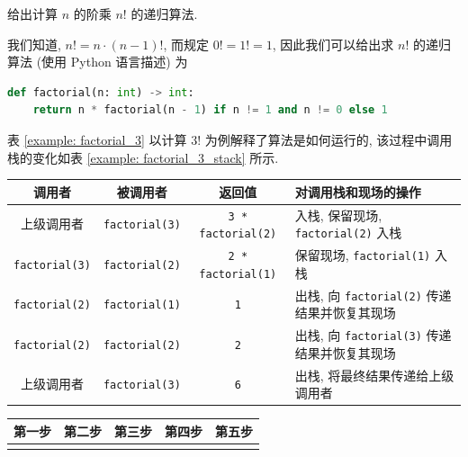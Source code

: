 \documentclass[10pt,UTF8]{book} %
\begin{document}
\begin{example}
    给出计算 $n$ 的阶乘 $n!$ 的递归算法.
    \begin{sol}
        我们知道, $n! = n \cdot (n-1)!$, 而规定 $0! = 1! = 1$,
        因此我们可以给出求 $n!$ 的递归算法
        (使用 Python 语言描述) 为
        \begin{lstlisting}[language=Python]
def factorial(n: int) -> int:
    return n * factorial(n - 1) if n != 1 and n != 0 else 1
        \end{lstlisting}
        表 \ref{example: factorial_3} 以计算 $3!$ 为例解释了算法是如何运行的, 该过程中调用栈的变化如表 \ref{example: factorial_3_stack} 所示.
        { %
        \label{example: factorial_3} %
        \begin{longtable}{cccp{16em}}
            \toprule
            \textbf{调用者} & \textbf{被调用者} & \textbf{返回值} & \textbf{对调用栈和现场的操作} \\
            \toprule
            \endhead
            \bottomrule
            \endfoot
        
            上级调用者 & \lstinline|factorial(3)| & \lstinline|3 * factorial(2)| & 入栈, 保留现场, \lstinline|factorial(2)| 入栈 \\
            \lstinline|factorial(3)| & \lstinline|factorial(2)| & \lstinline|2 * factorial(1)| & 保留现场, \lstinline|factorial(1)|  入栈\\ 
            \lstinline|factorial(2)| & \lstinline|factorial(1)| & \lstinline|1| & 出栈, 向 \lstinline|factorial(2)| 传递结果并恢复其现场 \\
            \lstinline|factorial(2)| & \lstinline|factorial(2)| & \lstinline|2| & 出栈, 向 \lstinline|factorial(3)| 传递结果并恢复其现场 \\ 
            上级调用者 & \lstinline|factorial(3)| & \lstinline|6| & 出栈, 将最终结果传递给上级调用者 \\
        \end{longtable}}
        { %
        \label{example: factorial_3_stack} %
        \begin{longtable}{|c|c|c|c|c|}
            \textbf{第一步} & \textbf{第二步} & \textbf{第三步} & \textbf{第四步} & \textbf{第五步} \\ 
            
            \endhead
            \endfoot
        

\end{longtable}}
\end{sol}
\end{example}
\end{document}
